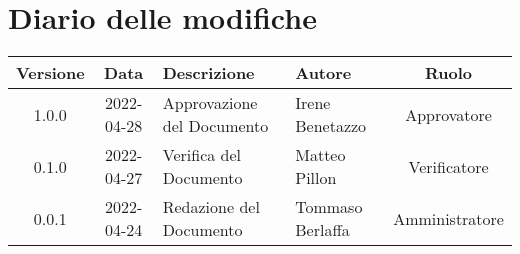 \section*{Diario delle modifiche}
	\begin{center}
	\renewcommand{\arraystretch}{1.8} %
	\begin{tabular}{ |c|c|m{12em}|m{7em}|c| }
	\hline
	\textbf{Versione} & \textbf{Data} & \textbf{Descrizione} &  \textbf{Autore} &  \textbf{Ruolo} \\ %
	\hline
	1.0.0 & 2022-04-28 & Approvazione del Documento & Irene Benetazzo & Approvatore\\
	\hline
	0.1.0 & 2022-04-27 & Verifica del Documento& Matteo Pillon & Verificatore\\
	\hline
    0.0.1 & 2022-04-24 & Redazione del Documento & Tommaso Berlaffa & Amministratore\\ %
	\hline
	\end{tabular}
	\end{center}
	\newpage